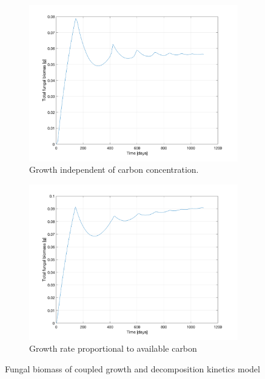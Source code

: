 \documentclass[12pt]{article}
\begin{document}
\begin{figure}[H]
\begin{subfigure}[t]{0.5\textwidth}
	\includegraphics[width=\textwidth]{biomass_growth_no_Cterm.png}
	\caption{Growth independent of carbon concentration.}
	\label{fig-a}
\end{subfigure}\hfill
\begin{subfigure}[t]{0.5\textwidth}
	\includegraphics[width=\textwidth]{biomass_growth_Cterm.png}
	\caption{Growth rate proportional to available carbon}
	\label{fig-b}
\end{subfigure}
\caption[Coupled/un-coupled fungi growth]{Fungal biomass of coupled growth and decomposition kinetics model} 
\label{Growth with and without coupling}
\end{figure}
\end{document}
